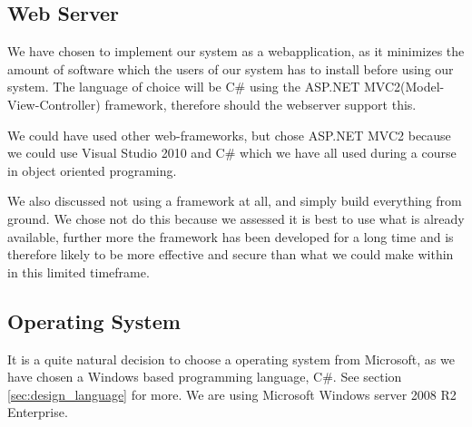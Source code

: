 \subsection{Web Server}
\label{subsec:webserver}


We have chosen to implement our system as a webapplication, as it minimizes the amount of software which the users of our system has to install before using our system.
The language of choice will be C\# using the ASP.NET MVC2(Model-View-Controller) framework, therefore should the webserver support this.

We could have used other web-frameworks, but chose ASP.NET MVC2 because we could use Visual Studio 2010 and C\# which we have all used during a course in object oriented programing.

We also discussed not using a framework at all, and simply build everything from ground.
We chose not do this because we assessed it is best to use what is already available, further more the framework has been developed for a long time and is therefore likely to be more effective and secure than what we could make within in this limited timeframe.


\subsection{Operating System}
\label{subsec:operating_system}
It is a quite natural decision to choose a operating system from Microsoft, as we have chosen a Windows based programming language, C\#. See section \ref{sec:design_language} for more.
We are using Microsoft Windows server 2008 R2 Enterprise. 